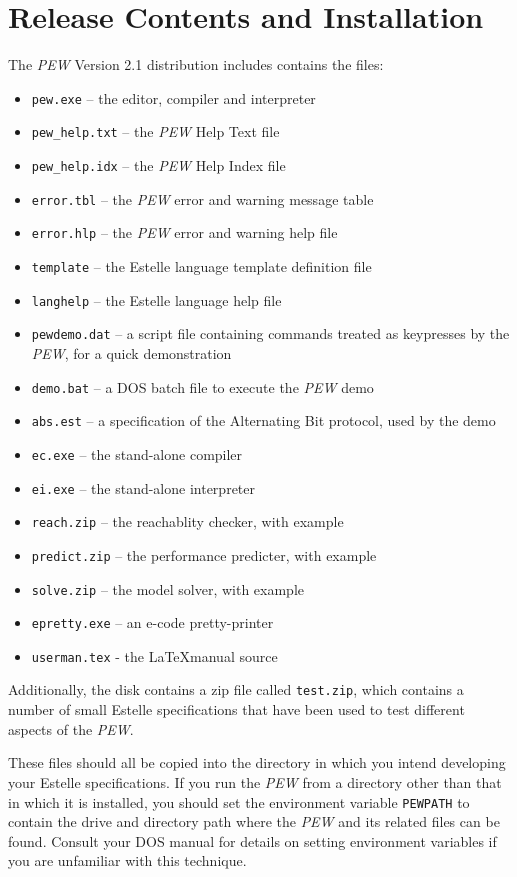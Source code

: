 \newpage
\section[Release Contents and Installation]{Release Contents and
Installation}

The {\em PEW} Version 2.1 distribution includes contains the files:

\begin {itemize}
\item {\tt pew.exe} -- the editor, compiler and interpreter
\item {\tt pew\_help.txt} -- the {\em PEW} Help Text file
\item {\tt pew\_help.idx} -- the {\em PEW} Help Index file
\item {\tt error.tbl} -- the {\em PEW} error and warning message table
\item {\tt error.hlp} -- the {\em PEW} error and warning help file
\item {\tt template} -- the Estelle language template definition file
\item {\tt langhelp} -- the Estelle language help file
\item {\tt pewdemo.dat} -- a script file containing commands treated
as keypresses by the {\em PEW}, for a quick demonstration
\item {\tt demo.bat} -- a DOS batch file to execute the {\em PEW} demo
\item {\tt abs.est} -- a specification of the Alternating Bit protocol,
used by the demo
\item {\tt ec.exe} -- the stand-alone compiler
\item {\tt ei.exe} -- the stand-alone interpreter
\item {\tt reach.zip} -- the reachablity checker, with example
\item {\tt predict.zip} -- the performance predicter, with example 
\item {\tt solve.zip} -- the model solver, with example
\item {\tt epretty.exe} -- an e-code pretty-printer
\item {\tt userman.tex} - the \LaTeX manual source
\end{itemize}

Additionally, the disk contains a zip file called {\tt test.zip},
which contains a number of small Estelle specifications that have
been used to test different aspects of the {\em PEW}.

These files should all be copied into the directory in which you
intend developing  your Estelle  specifications. If  you run the
{\em PEW}  from  a directory  other than that in which it is installed,
you should set the environment variable {\tt PEWPATH} to contain the drive
and directory path where the {\em PEW} and its related files can be
found. Consult your DOS manual for details on setting environment
variables if you are unfamiliar with this technique.

